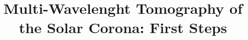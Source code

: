 \documentclass[baaa]{baaa}
\begin{document}



\title{Multi-Wavelenght Tomography of the Solar Corona: First Steps}
\subtitle{}

\end{document}
